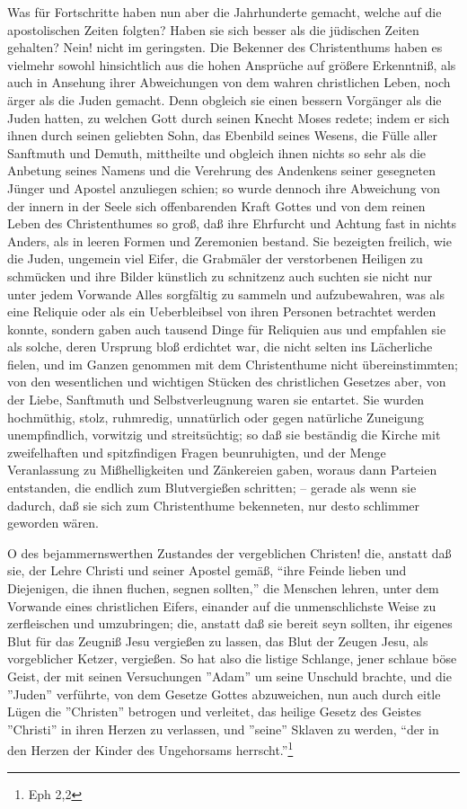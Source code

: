 Was für Fortschritte haben nun aber die Jahrhunderte gemacht, welche auf die
apostolischen Zeiten folgten? Haben sie sich besser als die jüdischen Zeiten
gehalten? Nein! nicht im geringsten. Die Bekenner des Christenthums haben es
vielmehr sowohl hinsichtlich aus die hohen Ansprüche auf größere Erkenntniß, als
auch in Ansehung ihrer Abweichungen von dem wahren christlichen Leben, noch
ärger als die Juden gemacht. Denn obgleich sie einen bessern Vorgänger als die
Juden hatten, zu welchen Gott durch seinen Knecht Moses redete; indem er sich
ihnen durch seinen geliebten Sohn, das Ebenbild seines Wesens, die Fülle aller
Sanftmuth und Demuth, mittheilte und obgleich ihnen nichts so sehr als die
Anbetung seines Namens und die Verehrung des Andenkens seiner gesegneten Jünger
und Apostel anzuliegen schien; so wurde dennoch ihre Abweichung von der innern
in der Seele sich offenbarenden Kraft Gottes und von dem reinen Leben des
Christenthumes so groß, daß ihre Ehrfurcht und Achtung fast in nichts Anders,
als in leeren Formen und Zeremonien bestand. Sie bezeigten freilich, wie die
Juden, ungemein viel Eifer, die Grabmäler der verstorbenen Heiligen zu schmücken
und ihre Bilder künstlich zu schnitzenz auch suchten sie nicht nur unter jedem
Vorwande Alles sorgfältig zu sammeln und aufzubewahren, was als eine Reliquie
oder als ein Ueberbleibsel von ihren Personen betrachtet werden konnte, sondern
gaben auch tausend Dinge für Reliquien aus und empfahlen sie als solche, deren
Ursprung bloß erdichtet war, die nicht selten ins Lächerliche fielen, und im
Ganzen genommen mit dem Christenthume nicht übereinstimmten; von den
wesentlichen und wichtigen Stücken des christlichen Gesetzes aber, von der
Liebe, Sanftmuth und Selbstverleugnung waren sie entartet. Sie wurden
hochmüthig, stolz, ruhmredig, unnatürlich oder gegen natürliche Zuneigung
unempfindlich, vorwitzig und streitsüchtig; so daß sie beständig die Kirche mit
zweifelhaften und spitzfindigen Fragen beunruhigten, und der Menge Veranlassung
zu Mißhelligkeiten und Zänkereien gaben, woraus dann Parteien entstanden, die
endlich zum Blutvergießen schritten; -- gerade als wenn sie dadurch, daß sie
sich zum Christenthume bekenneten, nur desto schlimmer geworden wären.

O des bejammernswerthen Zustandes der vergeblichen Christen! die, anstatt daß
sie, der Lehre Christi und seiner Apostel gemäß, "`ihre Feinde lieben und
Diejenigen, die ihnen fluchen, segnen sollten,"' die Menschen lehren, unter dem
Vorwande eines christlichen Eifers, einander auf die unmenschlichste Weise zu
zerfleischen und umzubringen; die, anstatt daß sie bereit seyn sollten, ihr
eigenes Blut für das Zeugniß Jesu vergießen zu lassen, das Blut der Zeugen Jesu,
als vorgeblicher Ketzer, vergießen. So hat also die listige Schlange, jener
schlaue böse Geist, der mit seinen Versuchungen ''Adam'' um seine Unschuld
brachte, und die ''Juden'' verführte, von dem Gesetze Gottes abzuweichen, nun
auch durch eitle Lügen die ''Christen'' betrogen und verleitet, das heilige
Gesetz des Geistes ''Christi'' in ihren Herzen zu verlassen, und ''seine''
Sklaven zu werden, "`der in den Herzen der Kinder des Ungehorsams
herrscht."'\footnote{Eph 2,2}

